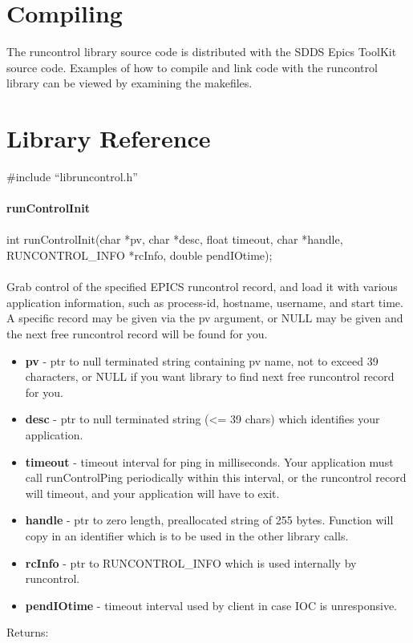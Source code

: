 \documentclass[11pt]{article}
\begin{document}
\section{Compiling}

The runcontrol library source code is distributed with the SDDS Epics ToolKit source code. Examples of how to compile and link code with the runcontrol library can be viewed by examining the makefiles.

\section{Library Reference}

\#include ``libruncontrol.h''\\
\\
{\bf runControlInit}\\
\\
int runControlInit(char *pv, char *desc, float timeout, char *handle, RUNCONTROL\_INFO *rcInfo, double pendIOtime);\\
\\
Grab control of the specified EPICS runcontrol record, and load it with various application information, such as process-id, hostname, username, and start time. A specific record may be given via the pv argument, or NULL may be given and the next free runcontrol record will be found for you.

\begin{itemize}
\item {\bf pv} - ptr to null terminated string containing pv name, not to exceed 39 characters, or NULL if you want library to find next free runcontrol record for you.
\item {\bf desc} - ptr to null terminated string (<= 39 chars) which identifies your application.
\item {\bf timeout} - timeout interval for ping in milliseconds. Your application must call runControlPing periodically within this interval, or the runcontrol record will timeout, and your application will have to exit.
\item {\bf handle} - ptr to zero length, preallocated string of 255 bytes. Function will copy in an identifier which is to be used in the other library calls.
\item {\bf rcInfo} - ptr to RUNCONTROL\_INFO which is used internally by runcontrol.
\item {\bf pendIOtime} - timeout interval used by client in case IOC is unresponsive.
\end{itemize}
Returns:
\end{document}
